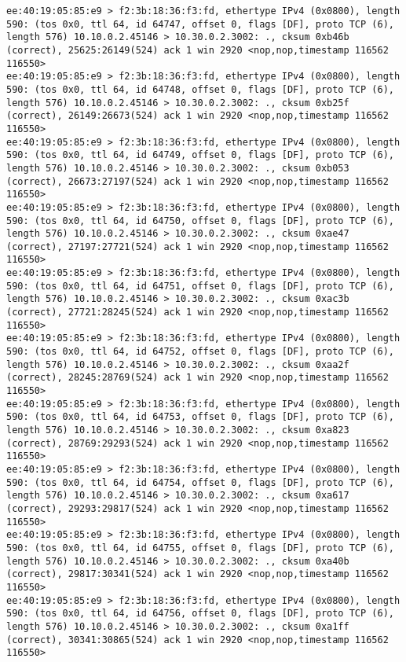 \documentclass[a4paper,12pt]{article}
\begin{document}
\begin{Verbatim}
ee:40:19:05:85:e9 > f2:3b:18:36:f3:fd, ethertype IPv4 (0x0800), length 590: (tos 0x0, ttl 64, id 64747, offset 0, flags [DF], proto TCP (6), length 576) 10.10.0.2.45146 > 10.30.0.2.3002: ., cksum 0xb46b (correct), 25625:26149(524) ack 1 win 2920 <nop,nop,timestamp 116562 116550>
ee:40:19:05:85:e9 > f2:3b:18:36:f3:fd, ethertype IPv4 (0x0800), length 590: (tos 0x0, ttl 64, id 64748, offset 0, flags [DF], proto TCP (6), length 576) 10.10.0.2.45146 > 10.30.0.2.3002: ., cksum 0xb25f (correct), 26149:26673(524) ack 1 win 2920 <nop,nop,timestamp 116562 116550>
ee:40:19:05:85:e9 > f2:3b:18:36:f3:fd, ethertype IPv4 (0x0800), length 590: (tos 0x0, ttl 64, id 64749, offset 0, flags [DF], proto TCP (6), length 576) 10.10.0.2.45146 > 10.30.0.2.3002: ., cksum 0xb053 (correct), 26673:27197(524) ack 1 win 2920 <nop,nop,timestamp 116562 116550>
ee:40:19:05:85:e9 > f2:3b:18:36:f3:fd, ethertype IPv4 (0x0800), length 590: (tos 0x0, ttl 64, id 64750, offset 0, flags [DF], proto TCP (6), length 576) 10.10.0.2.45146 > 10.30.0.2.3002: ., cksum 0xae47 (correct), 27197:27721(524) ack 1 win 2920 <nop,nop,timestamp 116562 116550>
ee:40:19:05:85:e9 > f2:3b:18:36:f3:fd, ethertype IPv4 (0x0800), length 590: (tos 0x0, ttl 64, id 64751, offset 0, flags [DF], proto TCP (6), length 576) 10.10.0.2.45146 > 10.30.0.2.3002: ., cksum 0xac3b (correct), 27721:28245(524) ack 1 win 2920 <nop,nop,timestamp 116562 116550>
ee:40:19:05:85:e9 > f2:3b:18:36:f3:fd, ethertype IPv4 (0x0800), length 590: (tos 0x0, ttl 64, id 64752, offset 0, flags [DF], proto TCP (6), length 576) 10.10.0.2.45146 > 10.30.0.2.3002: ., cksum 0xaa2f (correct), 28245:28769(524) ack 1 win 2920 <nop,nop,timestamp 116562 116550>
ee:40:19:05:85:e9 > f2:3b:18:36:f3:fd, ethertype IPv4 (0x0800), length 590: (tos 0x0, ttl 64, id 64753, offset 0, flags [DF], proto TCP (6), length 576) 10.10.0.2.45146 > 10.30.0.2.3002: ., cksum 0xa823 (correct), 28769:29293(524) ack 1 win 2920 <nop,nop,timestamp 116562 116550>
ee:40:19:05:85:e9 > f2:3b:18:36:f3:fd, ethertype IPv4 (0x0800), length 590: (tos 0x0, ttl 64, id 64754, offset 0, flags [DF], proto TCP (6), length 576) 10.10.0.2.45146 > 10.30.0.2.3002: ., cksum 0xa617 (correct), 29293:29817(524) ack 1 win 2920 <nop,nop,timestamp 116562 116550>
ee:40:19:05:85:e9 > f2:3b:18:36:f3:fd, ethertype IPv4 (0x0800), length 590: (tos 0x0, ttl 64, id 64755, offset 0, flags [DF], proto TCP (6), length 576) 10.10.0.2.45146 > 10.30.0.2.3002: ., cksum 0xa40b (correct), 29817:30341(524) ack 1 win 2920 <nop,nop,timestamp 116562 116550>
ee:40:19:05:85:e9 > f2:3b:18:36:f3:fd, ethertype IPv4 (0x0800), length 590: (tos 0x0, ttl 64, id 64756, offset 0, flags [DF], proto TCP (6), length 576) 10.10.0.2.45146 > 10.30.0.2.3002: ., cksum 0xa1ff (correct), 30341:30865(524) ack 1 win 2920 <nop,nop,timestamp 116562 116550>

\end{Verbatim}
\end{document}
